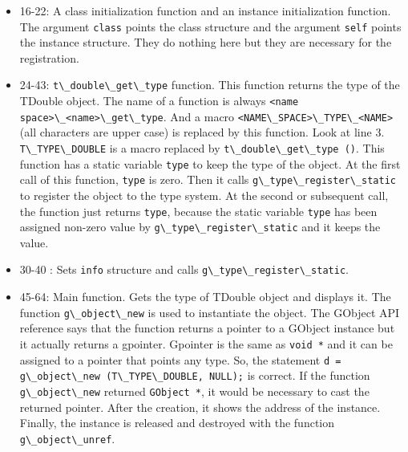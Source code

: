 \begin{itemize}
\tightlist
\item
  16-22: A class initialization function and an instance initialization
  function. The argument \passthrough{\lstinline!class!} points the
  class structure and the argument \passthrough{\lstinline!self!} points
  the instance structure. They do nothing here but they are necessary
  for the registration.
\item
  24-43: \passthrough{\lstinline!t\_double\_get\_type!} function. This
  function returns the type of the TDouble object. The name of a
  function is always
  \passthrough{\lstinline!<name space>\_<name>\_get\_type!}. And a macro
  \passthrough{\lstinline!<NAME\_SPACE>\_TYPE\_<NAME>!} (all characters
  are upper case) is replaced by this function. Look at line 3.
  \passthrough{\lstinline!T\_TYPE\_DOUBLE!} is a macro replaced by
  \passthrough{\lstinline!t\_double\_get\_type ()!}. This function has a
  static variable \passthrough{\lstinline!type!} to keep the type of the
  object. At the first call of this function,
  \passthrough{\lstinline!type!} is zero. Then it calls
  \passthrough{\lstinline!g\_type\_register\_static!} to register the
  object to the type system. At the second or subsequent call, the
  function just returns \passthrough{\lstinline!type!}, because the
  static variable \passthrough{\lstinline!type!} has been assigned
  non-zero value by \passthrough{\lstinline!g\_type\_register\_static!}
  and it keeps the value.
\item
  30-40 : Sets \passthrough{\lstinline!info!} structure and calls
  \passthrough{\lstinline!g\_type\_register\_static!}.
\item
  45-64: Main function. Gets the type of TDouble object and displays it.
  The function \passthrough{\lstinline!g\_object\_new!} is used to
  instantiate the object. The GObject API reference says that the
  function returns a pointer to a GObject instance but it actually
  returns a gpointer. Gpointer is the same as
  \passthrough{\lstinline!void *!} and it can be assigned to a pointer
  that points any type. So, the statement
  \passthrough{\lstinline!d = g\_object\_new (T\_TYPE\_DOUBLE, NULL);!}
  is correct. If the function \passthrough{\lstinline!g\_object\_new!}
  returned \passthrough{\lstinline!GObject *!}, it would be necessary to
  cast the returned pointer. After the creation, it shows the address of
  the instance. Finally, the instance is released and destroyed with the
  function \passthrough{\lstinline!g\_object\_unref!}.
\end{itemize}

